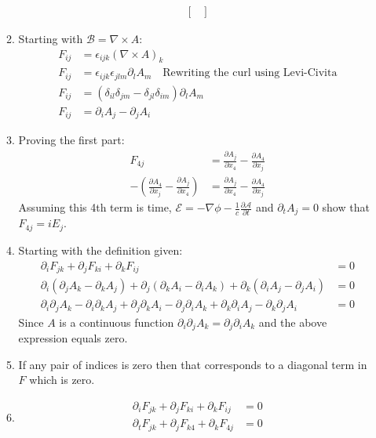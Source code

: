 \documentclass[12pt]{article}
\newcommand{\p}[2]{\frac{\partial #1}{\partial #2}}
\newcommand{\curl}{\nabla\times}
\begin{document}
\begin{enumerate}
\begin{enumerate}
\begin{gather*}
\begin{bmatrix}
                \end{bmatrix}
            \end{gather*}
            \item Starting with $\mathcal{B}=\curl A$:
            \begin{align*}
                F_{ij}&=\epsilon_{ijk}(\curl A)_k\\
                F_{ij}&=\epsilon_{ijk}\epsilon_{jlm}\partial_l A_m\quad\text{Rewriting the curl using Levi-Civita}\\
                F_{ij}&=(\delta_{il}\delta_{jm}-\delta_{jl}\delta_{im})\partial_l A_m\\
                F_{ij}&=\partial_i A_j-\partial_j A_i
            \end{align*}
            \item Proving the first part:
            \begin{align*}
                F_{4j}&=\p{A_j}{x_4}-\p{A_4}{x_j}\\
                -(\p{A_4}{x_j}-\p{A_j}{x_4})&=\p{A_j}{x_4}-\p{A_4}{x_j}
            \end{align*}
            Assuming this 4th term is time, $\mathcal{E}=-\nabla\phi-\frac{1}{c}\p{\mathcal{A}}{t}$ and $\partial_t A_j=0$ show that $F_{4j}=iE_j$.
            \item Starting with the definition given:
            \begin{align*}
                \partial_i F_{jk}+\partial_j F_{ki}+\partial_k F_{ij}&=0\\
                \partial_i (\partial_j A_k-\partial_k A_j)+\partial_j (\partial_k A_i-\partial_i A_k)+\partial_k (\partial_i A_j-\partial_j A_i)&=0\\
                \partial_i\partial_j A_k-\partial_i\partial_k A_j+\partial_j\partial_k A_i-\partial_j\partial_i A_k+\partial_k\partial_i A_j-\partial_k\partial_j A_i&=0
            \end{align*}
            Since $A$ is a continuous function $\partial_i\partial_j A_k=\partial_j\partial_i A_k$ and the above expression equals zero.
            \item If any pair of indices is zero then that corresponds to a diagonal term in $F$ which is zero.
            \item
            \begin{align*}
                \partial_i F_{jk}+\partial_j F_{ki}+\partial_k F_{ij}&=0\\
                \partial_t F_{jk}+\partial_j F_{k4}+\partial_k F_{4j}&=0\\

\end{align*}
\end{enumerate}
\end{enumerate}
\end{document}
